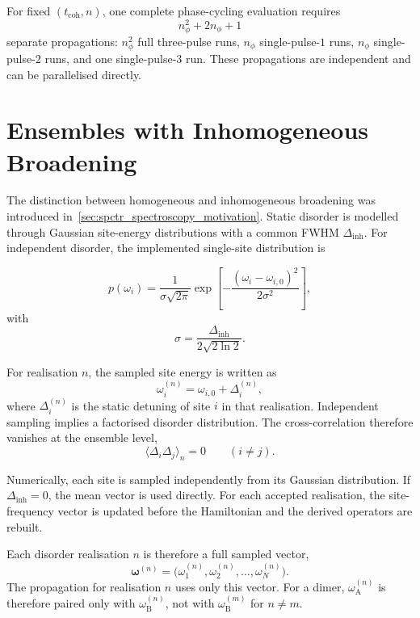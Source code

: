 For fixed \((t_{\mathrm{coh}},n)\), one complete phase-cycling evaluation requires
\begin{equation*}
n_{\phi}^2 + 2n_{\phi} + 1
\end{equation*}
separate propagations: \(n_{\phi}^2\) full three-pulse runs, \(n_{\phi}\) single-pulse-\(1\) runs, \(n_{\phi}\) single-pulse-\(2\) runs, and one single-pulse-\(3\) run. These propagations are independent and can be parallelised directly.

\section{Ensembles with Inhomogeneous Broadening}
\label{app:sec:inhomogeneous_broadening}
The distinction between homogeneous and inhomogeneous broadening was introduced
in~\cref{sec:spctr_spectroscopy_motivation}.
Static disorder is modelled through Gaussian site-energy distributions with
a common FWHM \(\Delta_{\mathrm{inh}}\).
For independent disorder, the implemented single-site distribution is

\begin{equation*}
p(\omega_i)=
\frac{1}{\sigma\sqrt{2\pi}}
\exp\!\left[
-\frac{(\omega_i-\omega_{i,0})^2}{2\sigma^2}
\right],
\end{equation*}
with
\begin{equation*}
\sigma=\frac{\Delta_{\mathrm{inh}}}{2\sqrt{2\ln 2}}.
\end{equation*}

For realisation \(n\), the sampled site energy is written as
\begin{equation*}
\omega_i^{(n)}=\omega_{i,0}+\Delta_i^{(n)},
\end{equation*}
where \(\Delta_i^{(n)}\) is the static detuning of site \(i\) in that
realisation.
Independent sampling implies a factorised disorder distribution. The
cross-correlation therefore vanishes at the ensemble level,
\begin{equation*}
\langle \Delta_i \Delta_j\rangle_n = 0 \qquad (i\neq j).
\end{equation*}

Numerically, each site is sampled independently from its Gaussian
distribution.
If \(\Delta_{\mathrm{inh}}=0\), the mean vector is used
directly.
For each accepted realisation, the site-frequency vector is updated before
the Hamiltonian and the derived operators are rebuilt.

Each disorder realisation \(n\) is therefore a full sampled vector,
\begin{equation*}
\boldsymbol{\omega}^{(n)}=
\bigl(\omega_1^{(n)},\omega_2^{(n)},\ldots,\omega_{N}^{(n)}\bigr).
\end{equation*}
The propagation for realisation \(n\) uses only this vector.
For a dimer, \(\omega_{\mathrm{A}}^{(n)}\) is therefore paired only with
\(\omega_{\mathrm{B}}^{(n)}\), not with \(\omega_{\mathrm{B}}^{(m)}\) for \(n\neq m\).

